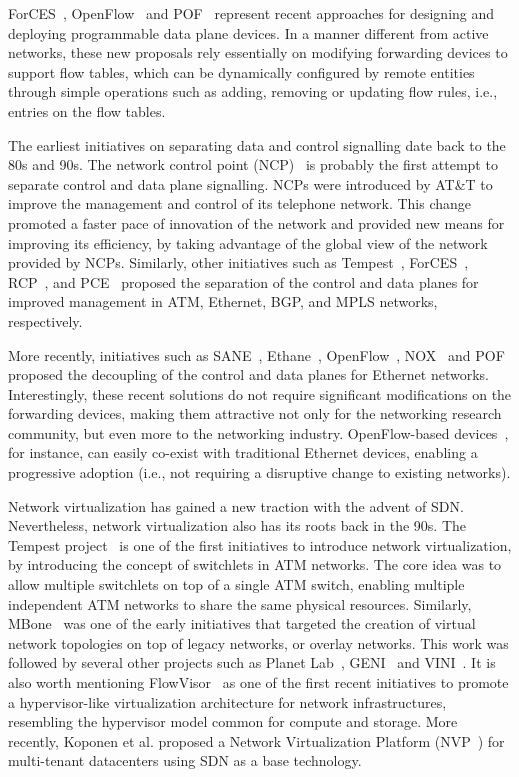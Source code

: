 ForCES~\cite{doria2010}, OpenFlow~\cite{mckeown2008} and POF~\cite{song2013}  represent recent approaches for designing and deploying programmable data plane devices.
In a manner different from active networks, these new proposals rely essentially on modifying forwarding devices to support flow tables, which can be dynamically configured by remote entities through simple operations such as adding, removing or updating flow rules, i.e., entries on the flow tables.

The earliest initiatives on separating data and control signalling date back to the 80s and 90s.
The network control point (NCP)~\cite{sheinbein1982} is probably the first attempt to separate 
control and data plane signalling. NCPs were introduced by AT\&T to improve the management and control 
of its telephone network. This change promoted a faster pace of innovation of the network and provided 
new means for improving its efficiency, by taking advantage of the global view of the network provided 
by NCPs. Similarly, other initiatives such as Tempest~\cite{merwe1998}, ForCES~\cite{doria2010},
RCP~\cite{caesar2005}, and PCE~\cite{vasseur2009} proposed the separation of the control 
and data planes for improved management in ATM, Ethernet, BGP, and MPLS networks, respectively.

More recently, initiatives such as SANE~\cite{casado2006}, Ethane~\cite{casado2007-1},
OpenFlow~\cite{mckeown2008}, NOX~\cite{gude2008} and POF~\cite{song2013} proposed the decoupling of the control and data planes 
for Ethernet networks. Interestingly, these recent solutions do not require significant modifications 
on the forwarding devices, making them attractive not only for the networking research community, but 
even more to the networking industry. OpenFlow-based devices~\cite{mckeown2008}, 
for instance, can easily co-exist with traditional Ethernet devices, enabling a progressive adoption 
(i.e., not requiring a disruptive change to existing networks).

Network virtualization has gained a new traction with the advent of SDN. Nevertheless, network virtualization 
also has its roots back in the 90s. The Tempest project~\cite{merwe1998} is one of the first initiatives to 
introduce network virtualization, by introducing the concept of switchlets in ATM networks. The core idea 
was to allow multiple switchlets on top of a single ATM switch, enabling multiple independent ATM networks 
to share the same physical resources. Similarly, MBone~\cite{macedonia1994} was one of the early initiatives that 
targeted the creation of virtual network topologies on top of legacy networks, or overlay networks. This work 
was followed by several other projects such as Planet Lab~\cite{chun2003}, GENI~\cite{peterson2006} 
and VINI~\cite{bavier2006-1}. It is also worth mentioning FlowVisor~\cite{sherwood} as one of the first recent initiatives to promote a 
hypervisor-like virtualization architecture for network infrastructures, resembling the hypervisor model 
common for compute and storage.
More recently, Koponen et al. proposed a Network Virtualization Platform (NVP~\cite{koponen}) for multi-tenant datacenters using SDN as a base technology.

